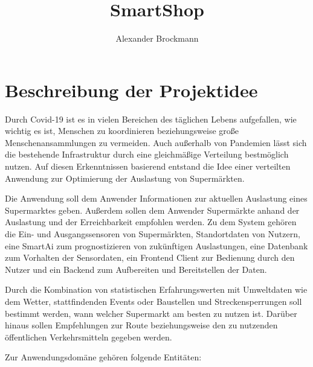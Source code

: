 \documentclass[runningheads]{llncs}
\begin{document}
%
\title{SmartShop}
%
%
\author{Alexander Brockmann}
%
%


%
\maketitle              %

\section{Beschreibung der Projektidee}
Durch Covid-19 ist es in vielen Bereichen des täglichen Lebens aufgefallen, wie wichtig es ist, Menschen zu koordinieren beziehungsweise große Menschenansammlungen zu vermeiden.
Auch außerhalb von Pandemien lässt sich die bestehende Infrastruktur durch eine gleichmäßige Verteilung bestmöglich nutzen.
Auf diesen Erkenntnissen basierend entstand die Idee einer verteilten Anwendung zur Optimierung der Auslastung von Supermärkten.

Die Anwendung soll dem Anwender Informationen zur aktuellen Auslastung eines Supermarktes geben.
Außerdem sollen dem Anwender Supermärkte anhand der Auslastung und der Erreichbarkeit empfohlen werden.
Zu dem System gehören die Ein- und Ausgangssensoren von Supermärkten, Standortdaten von Nutzern, eine SmartAi zum prognostizieren von zukünftigen Auslastungen, eine Datenbank zum Vorhalten der Sensordaten, ein Frontend Client zur Bedienung durch den Nutzer und ein Backend zum Aufbereiten und Bereitstellen der Daten.

Durch die Kombination von statistischen Erfahrungswerten mit Umweltdaten wie dem Wetter, stattfindenden Events oder Baustellen und Streckensperrungen soll bestimmt werden, wann welcher Supermarkt am besten zu nutzen ist.
Darüber hinaus sollen Empfehlungen zur Route beziehungsweise den zu nutzenden öffentlichen Verkehrsmitteln gegeben werden.

Zur Anwendungsdomäne gehören folgende Entitäten:
\end{document}
